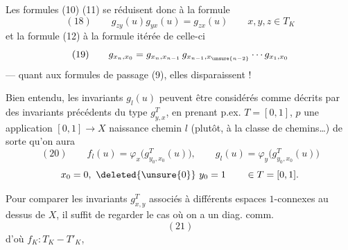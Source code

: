 Les formules (10) (11) se réduisent donc à la formule
\[
(18)\qquad g_{zy}(u)g_{yx}(u)=g_{zx}(u)\qquad x,y,z\in T_K
\]
et la formule (12) à la formule itérée de celle-ci
\[
(19)\qquad g_{x_n,x_0}=g_{x_n,x_{n-1}}\,g_{x_{n-1},x_{\unsure{n-2}}}\cdots g_{x_1,x_0}
\]
--- quant aux formules de passage (9), elles  disparaissent !

Bien entendu, les invariants $g_l(u)$  peuvent être considérés comme décrits par des invariants précédents du type $g_{y,x}^T$, en prenant  p.ex. $T=[0,1]$, $p$ une application $[0,1]\longrightarrow X$  naissance  chemin $l$ (plutôt, à la classe de chemins\ldots) de sorte qu'on aura
\[
(20)\qquad f_l(u)=\varphi_x\bigl(g_{y_0,x_0}^T(u)\bigr),\qquad g_l(u)=\varphi_y\bigl(g_{y_0,x_0}^T(u)\bigr)
\]
\[
x_0=0,\ \deleted{\unsure{0}}\ y_0=1\qquad\in T=[0,1].
\]

Pour comparer les invariants $g_{x,y}^T$ associés à différents espaces $1$-connexes au dessus de $X$, il suffit de regarder le cas où on a un diag. comm.
\[
(21)
\]
d'où $f_K:T_K\mathbin{-}T'_K$,
